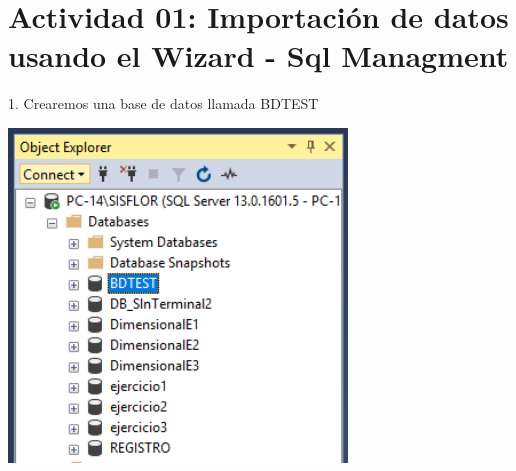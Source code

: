 \section{Actividad 01: Importación de datos usando el Wizard - Sql Managment} 

1. Crearemos una base de datos llamada BDTEST\\
	\begin{center}
	\includegraphics[width=9cm]{./Imagenes/img1}
	\end{center}	


